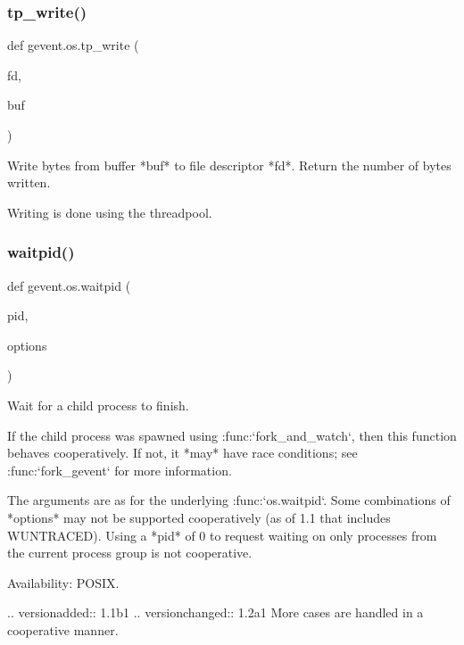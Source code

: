 \subsubsection{\texorpdfstring{tp\+\_\+write()}{tp\_write()}}
{\footnotesize\ttfamily def gevent.\+os.\+tp\+\_\+write (\begin{DoxyParamCaption}\item[{}]{fd,  }\item[{}]{buf }\end{DoxyParamCaption})}

\begin{DoxyVerb}Write bytes from buffer *buf* to file descriptor *fd*. Return the
number of bytes written.

Writing is done using the threadpool.
\end{DoxyVerb}
 \mbox{\label{namespacegevent_1_1os_a73d51adddb408a122bc8137102f54653}} 
\subsubsection{\texorpdfstring{waitpid()}{waitpid()}}
{\footnotesize\ttfamily def gevent.\+os.\+waitpid (\begin{DoxyParamCaption}\item[{}]{pid,  }\item[{}]{options }\end{DoxyParamCaption})}

\begin{DoxyVerb}Wait for a child process to finish.

If the child process was spawned using
:func:`fork_and_watch`, then this function behaves
cooperatively. If not, it *may* have race conditions; see
:func:`fork_gevent` for more information.

The arguments are as for the underlying
:func:`os.waitpid`. Some combinations of *options* may not
be supported cooperatively (as of 1.1 that includes
WUNTRACED). Using a *pid* of 0 to request waiting on only processes
from the current process group is not cooperative.

Availability: POSIX.

.. versionadded:: 1.1b1
.. versionchanged:: 1.2a1
   More cases are handled in a cooperative manner.
\end{DoxyVerb}
 